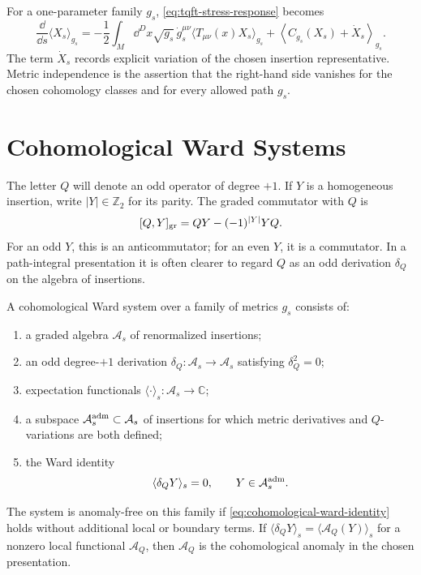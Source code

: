 For a one-parameter family \(g_s\), \eqref{eq:tqft-stress-response} becomes
\begin{equation}
  \frac{\dd}{\dd s}\langle X_s\rangle_{g_s}
  =
  -\frac12\int_M\dd^Dx\sqrt{g_s}\,
  \dot g_s^{\mu\nu}\langle T_{\mu\nu}(x)X_s\rangle_{g_s}
  +
  \left\langle C_{\dot g_s}(X_s)+\dot X_s\right\rangle_{g_s}.
  \label{eq:tqft-one-parameter-metric-response}
\end{equation}
The term \(\dot X_s\) records explicit variation of the chosen insertion
representative.  Metric independence is the assertion that the right-hand
side vanishes for the chosen cohomology classes and for every allowed
path \(g_s\).

\section{Cohomological Ward Systems}

The letter \(Q\) will denote an odd operator of degree \(+1\).  If \(Y\) is a
homogeneous insertion, write \(|Y|\in\mathbb Z_2\) for its parity.  The
graded commutator with \(Q\) is
\[
  [Q,Y]_{\rm gr}=QY-(-1)^{|Y|}YQ .
\]
For an odd \(Y\), this is an anticommutator; for an even \(Y\), it is a
commutator.  In a path-integral presentation it is often clearer to regard
\(Q\) as an odd derivation \(\delta_Q\) on the algebra of insertions.

\begin{definition}
\label{def:cohomological-ward-system}
A cohomological Ward system over a family of metrics \(g_s\) consists of:
\begin{enumerate}[label=(\roman*)]
\item a graded algebra \(\mathcal A_s\) of renormalized insertions;
\item an odd degree-\(+1\) derivation
  \(\delta_Q:\mathcal A_s\to\mathcal A_s\) satisfying
  \(\delta_Q^2=0\);
\item expectation functionals
  \(\langle\cdot\rangle_s:\mathcal A_s\to\mathbb C\);
\item a subspace \(\mathcal A_s^{\rm adm}\subset\mathcal A_s\) of insertions
  for which metric derivatives and \(Q\)-variations are both defined;
\item the Ward identity
  \begin{equation}
    \langle\delta_Q Y\rangle_s=0,
    \qquad
    Y\in\mathcal A_s^{\rm adm}.
    \label{eq:cohomological-ward-identity}
  \end{equation}
\end{enumerate}
The system is anomaly-free on this family if
\eqref{eq:cohomological-ward-identity} holds without additional local or
boundary terms.  If
\(\langle\delta_QY\rangle_s=\langle\mathcal A_Q(Y)\rangle_s\) for a nonzero
local functional \(\mathcal A_Q\), then \(\mathcal A_Q\) is the
cohomological anomaly in the chosen presentation.
\end{definition}

